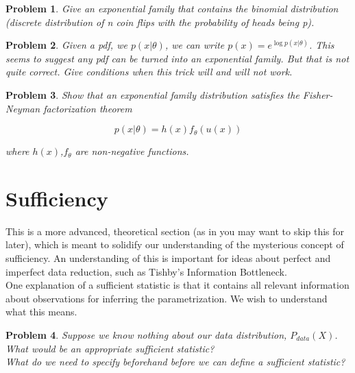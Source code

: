 \documentclass[a4paper]{article}
\newtheorem{problem}{Problem}[section]
\begin{document}
\begin{problem}
  Give an exponential family that contains the binomial distribution (discrete distribution of n coin flips with the probability of heads being p).
\end{problem}

\begin{problem}
  Given a pdf, we $p(x \vert \theta)$, we can write $p(x) = e^{\log p( x \vert \theta)}$.  This seems to suggest any pdf can be turned into an exponential family.  But that is not quite correct.  Give conditions when this trick will and will not work.
\end{problem}

\begin{problem}
Show that an exponential family distribution satisfies the Fisher-Neyman factorization theorem

\begin{equation}
  p(x \vert \theta) = h(x) f_\theta( u(x) )
  \label{}
\end{equation}

where $h(x)$,$f_\theta$ are non-negative functions.

\end{problem}


\section{Sufficiency}

This is a more advanced, theoretical section (as in you may want to skip this for later), which is meant to solidify our understanding of the mysterious concept of sufficiency.  An understanding of this is important for ideas about perfect and imperfect data reduction, such as Tishby's Information Bottleneck. \\

One explanation of a sufficient statistic is that it contains all relevant information about observations for inferring the parametrization.  We wish to understand what this means.

\begin{problem}
Suppose we know nothing about our data distribution, $P_{data}(X)$.  What would be an appropriate sufficient statistic?  \\
What do we need to specify beforehand before we can define a sufficient statistic?  
\end{problem}
\end{document}
